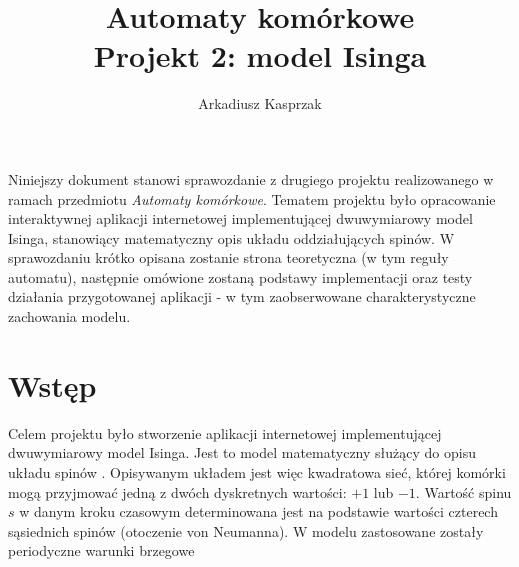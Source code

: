 \documentclass[11pt] {article}
\title {
	\large Automaty komórkowe \\
    \normalsize Projekt 2: model Isinga
    }
\author {Arkadiusz Kasprzak}
\date{}
\renewenvironment{abstract}
 {\small
  \begin{center}
  \bfseries \abstractname\vspace{-.5em}\vspace{0pt}
  \end{center}
  \list{}{%
    \setlength{\leftmargin}{5mm}%
    \setlength{\rightmargin}{\leftmargin}%
  }%
  \item\relax}
 {\endlist}
\begin{document}
\maketitle

\begin{abstract}
Niniejszy dokument stanowi sprawozdanie z drugiego projektu realizowanego w ramach przedmiotu \textit{Automaty komórkowe}. Tematem projektu było opracowanie interaktywnej aplikacji internetowej implementującej dwuwymiarowy model Isinga, stanowiący matematyczny opis układu oddziałujących spinów. W sprawozdaniu krótko opisana zostanie strona teoretyczna (w tym reguły automatu), następnie omówione zostaną podstawy implementacji oraz testy działania przygotowanej aplikacji - w tym zaobserwowane charakterystyczne zachowania modelu.

\end{abstract}

\tableofcontents

\newpage 

\section{Wstęp}
Celem projektu było stworzenie aplikacji internetowej implementującej dwuwymiarowy model Isinga. Jest to model matematyczny służący do opisu układu spinów \cite{mostowicz}. Opisywanym układem jest więc kwadratowa sieć, której komórki mogą przyjmować jedną z dwóch dyskretnych wartości: $+1$ lub $-1$. Wartość spinu $s$ w danym kroku czasowym determinowana jest na podstawie wartości czterech sąsiednich spinów (otoczenie von Neumanna). W modelu zastosowane zostały periodyczne warunki brzegowe 
\end{document}
